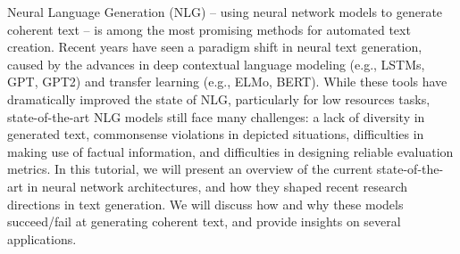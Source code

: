 Neural Language Generation (NLG) -- using neural network models to generate coherent text -- is among the most promising methods for automated text creation.  Recent years have seen a paradigm shift in neural text generation, caused by the advances in deep contextual language modeling (e.g., LSTMs, GPT, GPT2) and transfer learning (e.g., ELMo, BERT). While these tools have dramatically improved the state of NLG, particularly for low resources tasks, state-of-the-art NLG models still face many challenges: a lack of diversity in generated text, commonsense violations in depicted situations, difficulties in making use of factual information, and difficulties in designing reliable evaluation metrics. In this tutorial, we will present an overview of the current state-of-the-art in neural network architectures, and how they shaped recent research directions in text generation. We will discuss how and why these models succeed/fail at generating coherent text, and provide insights on several applications.
